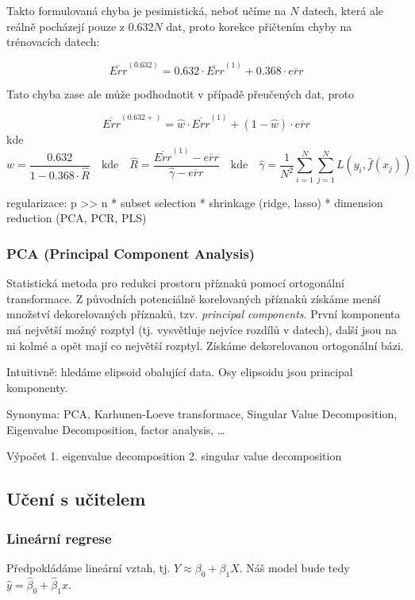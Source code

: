 \documentclass[11pt]{report} %
\numberwithin{equation}{section}
\begin{document}
Takto formulovaná chyba je pesimistická, neboť učíme na $N$ datech, která ale reálně pocházejí pouze z 0.632$N$ dat, proto korekce přičtením chyby na trénovacích datech:

$$\overline{Err}^{(0.632)} = 0.632\cdot \overline{Err}^{(1)} + 0.368 \cdot \overline{err}$$

Tato chyba zase ale může podhodnotit v případě přeučených dat, proto 

$$\overline{Err}^{(0.632+)} = \hat{w}\cdot \overline{Err}^{(1)} + (1-\hat{w})\cdot \overline{err}$$
kde
$$w = \frac{0.632}{1 - 0.368\cdot\hat{R}}
\quad \text{kde}\quad 
\hat{R} = \frac{\overline{Err}^{(1)} - \overline{err}}{\hat{\gamma} - \overline{err}}
\quad \text{kde}\quad 
\hat{\gamma} = \frac{1}{N^2}\sum_{i=1}^{N}\sum_{j=1}^{N}L(y_i,\hat{f}(x_j))
$$


regularizace: p >> n
* subset selection
* shrinkage (ridge, lasso)
* dimension reduction (PCA, PCR, PLS)

\subsubsection{PCA (Principal Component Analysis)}
Statistická metoda pro redukci prostoru příznaků pomocí ortogonální transformace. Z původních potenciálně korelovaných příznaků získáme menší množství dekorelovaných příznaků, tzv. \textit{principal components}. První komponenta má největší možný rozptyl (tj. vysvětluje nejvíce rozdílů v datech), další jsou na ni kolmé a opět mají co největší rozptyl. Získáme dekorelovanou ortogonální bázi.

Intuitivně: hledáme elipsoid obalující data. Osy elipsoidu jsou principal komponenty.

Synonyma: PCA, Karhunen-Loeve transformace, Singular Value Decomposition, Eigenvalue Decomposition, factor analysis, \dots

Výpočet 
1. eigenvalue decomposition
2. singular value decomposition



\subsection{Učení s učitelem}
\subsubsection{Lineární regrese}
Předpokládáme lineární vztah, tj. $Y \approx \beta_0 + \beta_1 X$. Náš model bude tedy $\hat{y} = \hat{\beta}_0 + \hat{\beta}_1 x$. 
\end{document}
